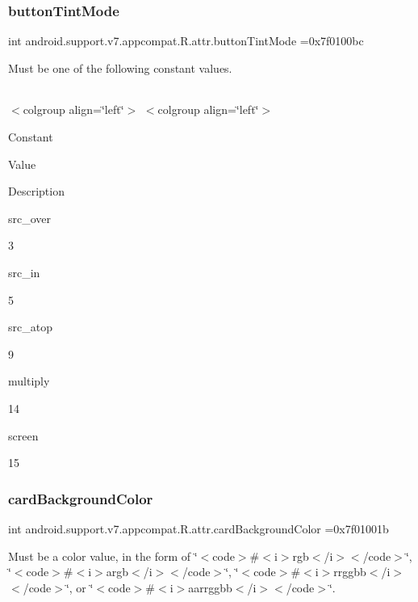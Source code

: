 \subsubsection{\texorpdfstring{button\+Tint\+Mode}{buttonTintMode}}
{\footnotesize\ttfamily int android.\+support.\+v7.\+appcompat.\+R.\+attr.\+button\+Tint\+Mode =0x7f0100bc\hspace{0.3cm}{\ttfamily [static]}}

Must be one of the following constant values.

\tabulinesep=1mm
\begin{longtabu} spread 0pt [c]{*{0}{|X[-1]}|}
\hline
\end{longtabu}
$<$colgroup align=\char`\"{}left\char`\"{}$>$ $<$colgroup align=\char`\"{}left\char`\"{}$>$ 

Constant

Value

Description 

{\ttfamily src\+\_\+over}

3

{\ttfamily src\+\_\+in}

5

{\ttfamily src\+\_\+atop}

9

{\ttfamily multiply}

14

{\ttfamily screen}

15\mbox{\label{classandroid_1_1support_1_1v7_1_1appcompat_1_1R_1_1attr_a8af9587e6c5641d55965fddcd9ef548e}} 
\subsubsection{\texorpdfstring{card\+Background\+Color}{cardBackgroundColor}}
{\footnotesize\ttfamily int android.\+support.\+v7.\+appcompat.\+R.\+attr.\+card\+Background\+Color =0x7f01001b\hspace{0.3cm}{\ttfamily [static]}}

Must be a color value, in the form of \char`\"{}$<$code$>$\#$<$i$>$rgb$<$/i$>$$<$/code$>$\char`\"{}, \char`\"{}$<$code$>$\#$<$i$>$argb$<$/i$>$$<$/code$>$\char`\"{}, \char`\"{}$<$code$>$\#$<$i$>$rrggbb$<$/i$>$$<$/code$>$\char`\"{}, or \char`\"{}$<$code$>$\#$<$i$>$aarrggbb$<$/i$>$$<$/code$>$\char`\"{}. 


